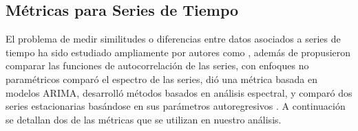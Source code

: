 \documentclass[12pt,oneside]{book}\usepackage[]{graphicx}\usepackage[]{color}
\theoremstyle{definition} %
\begin{document}
\subsection{Métricas para Series de Tiempo}
\label{sec:metrica}
El problema de medir similitudes o diferencias entre datos asociados a series de tiempo ha sido estudiado ampliamente por autores como \citeauthor{johnson2004multivariate} \citeyear{johnson2004multivariate}, además de \citeauthor{galeano2000multivariate} \citeyear{galeano2000multivariate} propusieron comparar las funciones de autocorrelación de las series, \citeauthor{diggle1991nonparametric} \citeyear{diggle1991nonparametric} con enfoques no paramétricos comparó el espectro de las series,  \citeauthor{piccolo1990distance} \citeyear{piccolo1990distance} dió una métrica basada en modelos ARIMA, \citeauthor{diggle1997spectral} \citeyear{diggle1997spectral} desarrolló métodos basados en análisis espectral, y \citeauthor{maharaj2000cluster} \citeyear{maharaj2000cluster} comparó dos series estacionarias basándose en sus parámetros autoregresivos . A continuación se detallan dos de las métricas que se utilizan en nuestro análisis.
\end{document}
